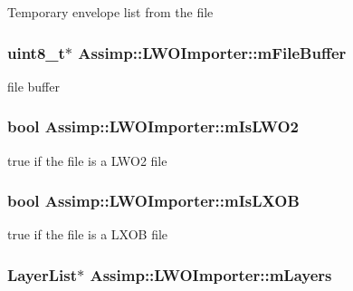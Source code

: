 Temporary envelope list from the file \hypertarget{class_assimp_1_1_l_w_o_importer_a6c2025aee6fb01201ec7e06d57e8b991}{
\subsubsection[{m\+File\+Buffer}]{\setlength{\rightskip}{0pt plus 5cm}uint8\+\_\+t$\ast$ Assimp\+::\+L\+W\+O\+Importer\+::m\+File\+Buffer\hspace{0.3cm}{\ttfamily [protected]}}}\label{class_assimp_1_1_l_w_o_importer_a6c2025aee6fb01201ec7e06d57e8b991}
file buffer \hypertarget{class_assimp_1_1_l_w_o_importer_aa5df677055718f70b6af72f342879e48}{
\subsubsection[{m\+Is\+L\+W\+O2}]{\setlength{\rightskip}{0pt plus 5cm}bool Assimp\+::\+L\+W\+O\+Importer\+::m\+Is\+L\+W\+O2\hspace{0.3cm}{\ttfamily [protected]}}}\label{class_assimp_1_1_l_w_o_importer_aa5df677055718f70b6af72f342879e48}
true if the file is a L\+W\+O2 file \hypertarget{class_assimp_1_1_l_w_o_importer_a44c58156ab0b73965435b088678e4660}{
\subsubsection[{m\+Is\+L\+X\+O\+B}]{\setlength{\rightskip}{0pt plus 5cm}bool Assimp\+::\+L\+W\+O\+Importer\+::m\+Is\+L\+X\+O\+B\hspace{0.3cm}{\ttfamily [protected]}}}\label{class_assimp_1_1_l_w_o_importer_a44c58156ab0b73965435b088678e4660}
true if the file is a L\+X\+O\+B file \hypertarget{class_assimp_1_1_l_w_o_importer_a7db7299c8200eec4c4cf2f2d38de0a3f}{
\subsubsection[{m\+Layers}]{\setlength{\rightskip}{0pt plus 5cm}Layer\+List$\ast$ Assimp\+::\+L\+W\+O\+Importer\+::m\+Layers\hspace{0.3cm}{\ttfamily [protected]}}}\label{class_assimp_1_1_l_w_o_importer_a7db7299c8200eec4c4cf2f2d38de0a3f}
